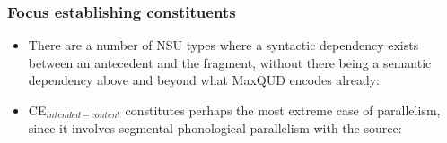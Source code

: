 \documentclass{beamer}
\newcommand{\mq}{MaxQUD }
\newcommand{\bit}{\begin{itemize}}
\newcommand{\eit}{\end{itemize}}
\begin{document}
\begin{frame}\frametitle{Focus establishing constituents}

\bit

\item
There are a number of NSU types where a syntactic dependency exists
between an antecedent and the fragment, without there being a semantic
dependency above and beyond what \mq encodes already:
  

\item CE$_{intended-content}$ constitutes perhaps the most extreme
  case of parallelism, since it involves segmental phonological
  parallelism with the source:

\eit
\end{frame}
\end{document}
